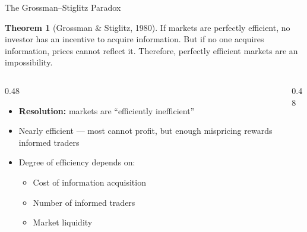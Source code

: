 \documentclass[9pt, aspectratio=169, t]{beamer}
\theoremstyle{definition}
\newtheorem{thm}{Theorem}
\newenvironment{cminipage}[1]{%
    \par\noindent\hfill\begin{minipage}{#1}\ignorespaces
}{%
    \end{minipage}\hfill\null\par
}
\begin{document}
\begin{frame}{The Grossman--Stiglitz Paradox}
\begin{cminipage}{0.95\textwidth}
\begin{thm}[Grossman \& Stiglitz, 1980]
\small
If markets are perfectly efficient, no investor has an incentive to acquire information. But if no one acquires information, prices cannot reflect it. Therefore, perfectly efficient markets are an impossibility.
\end{thm}

\vspace{0.2cm}
\begin{columns}[T]
\begin{column}{0.48\textwidth}
\small
\begin{itemize}\setlength{\itemsep}{0pt}
    \item \textbf{Resolution:} markets are ``efficiently inefficient''
    \item Nearly efficient --- most cannot profit, but enough mispricing rewards informed traders
    \item Degree of efficiency depends on:
    \begin{itemize}\setlength{\itemsep}{0pt}
        \item Cost of information acquisition
        \item Number of informed traders
        \item Market liquidity
    \end{itemize}
\end{itemize}
\end{column}
\begin{column}{0.48\textwidth}
\begin{center}
\end{center}
\end{column}
\end{columns}
\end{cminipage}
\end{frame}
\end{document}
